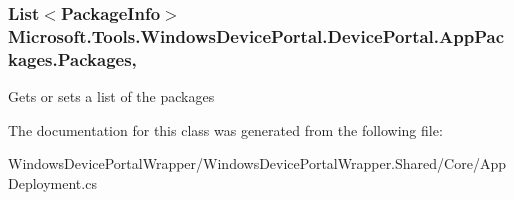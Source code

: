 \subsubsection[{\texorpdfstring{Packages}{Packages}}]{\setlength{\rightskip}{0pt plus 5cm}List$<${\bf Package\+Info}$>$ Microsoft.\+Tools.\+Windows\+Device\+Portal.\+Device\+Portal.\+App\+Packages.\+Packages\hspace{0.3cm}{\ttfamily [get]}, {\ttfamily [set]}}\hypertarget{class_microsoft_1_1_tools_1_1_windows_device_portal_1_1_device_portal_1_1_app_packages_ab1e09562bc75ae954e0a3b5a3b78abd3}{}\label{class_microsoft_1_1_tools_1_1_windows_device_portal_1_1_device_portal_1_1_app_packages_ab1e09562bc75ae954e0a3b5a3b78abd3}


Gets or sets a list of the packages 



The documentation for this class was generated from the following file\+:\begin{DoxyCompactItemize}
\item 
Windows\+Device\+Portal\+Wrapper/\+Windows\+Device\+Portal\+Wrapper.\+Shared/\+Core/App\+Deployment.\+cs\end{DoxyCompactItemize}

